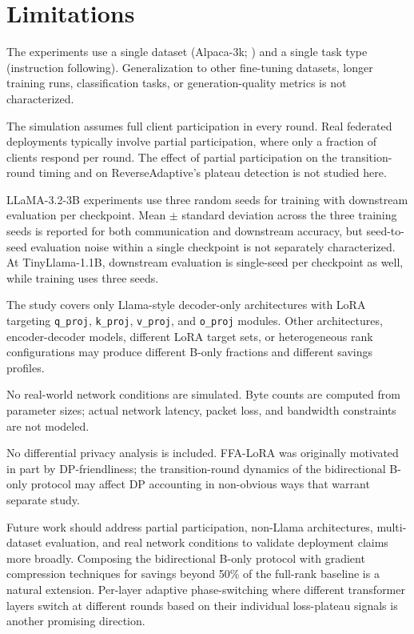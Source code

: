 \section{Limitations}
\label{sec:limitations}

The experiments use a single dataset (Alpaca-3k; \citealt{taori2023alpaca}) and a single task type (instruction following). Generalization to other fine-tuning datasets, longer training runs, classification tasks, or generation-quality metrics is not characterized.

The simulation assumes full client participation in every round. Real federated deployments typically involve partial participation, where only a fraction of clients respond per round. The effect of partial participation on the transition-round timing and on ReverseAdaptive's plateau detection is not studied here.

LLaMA-3.2-3B experiments use three random seeds for training with downstream evaluation per checkpoint. Mean $\pm$ standard deviation across the three training seeds is reported for both communication and downstream accuracy, but seed-to-seed evaluation noise within a single checkpoint is not separately characterized. At TinyLlama-1.1B, downstream evaluation is single-seed per checkpoint as well, while training uses three seeds.

The study covers only Llama-style decoder-only architectures with LoRA targeting \texttt{q\_proj}, \texttt{k\_proj}, \texttt{v\_proj}, and \texttt{o\_proj} modules. Other architectures, encoder-decoder models, different LoRA target sets, or heterogeneous rank configurations may produce different B-only fractions and different savings profiles.

No real-world network conditions are simulated. Byte counts are computed from parameter sizes; actual network latency, packet loss, and bandwidth constraints are not modeled.

No differential privacy analysis is included. FFA-LoRA \citep{sun2024ffalora} was originally motivated in part by DP-friendliness; the transition-round dynamics of the bidirectional B-only protocol may affect DP accounting in non-obvious ways that warrant separate study.

Future work should address partial participation, non-Llama architectures, multi-dataset evaluation, and real network conditions to validate deployment claims more broadly. Composing the bidirectional B-only protocol with gradient compression techniques \citep{alistarh2017qsgd,lin2017deep} for savings beyond 50\% of the full-rank baseline is a natural extension. Per-layer adaptive phase-switching where different transformer layers switch at different rounds based on their individual loss-plateau signals is another promising direction.

